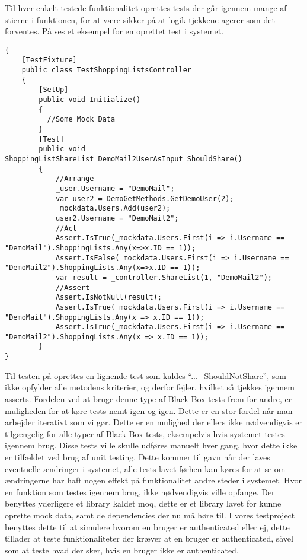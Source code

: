 Til hver enkelt testede funktionalitet oprettes tests der går igennem mange af stierne i funktionen, for at være sikker på at logik tjekkene agerer som det forventes.
På  ses et eksempel for en oprettet test i systemet.

\begin{lstlisting}[caption="En test for ``ShareList'' metodern i ``ShoppingListController''\, heri tjekkes hvorom den bruger listen deles med\, får listen sat ind på brugerens liste over shoppinglister.", label=lsttest]
{
    [TestFixture]
    public class TestShoppingListsController
    {
		[SetUp]
        public void Initialize()
        {
          //Some Mock Data
        }
        [Test]
        public void ShoppingListShareList_DemoMail2UserAsInput_ShouldShare()
        {
            //Arrange
            _user.Username = "DemoMail";
            var user2 = DemoGetMethods.GetDemoUser(2);
            _mockdata.Users.Add(user2); 
            user2.Username = "DemoMail2";
            //Act
            Assert.IsTrue(_mockdata.Users.First(i => i.Username == "DemoMail").ShoppingLists.Any(x=>x.ID == 1));
            Assert.IsFalse(_mockdata.Users.First(i => i.Username == "DemoMail2").ShoppingLists.Any(x=>x.ID == 1));
            var result = _controller.ShareList(1, "DemoMail2");
            //Assert
            Assert.IsNotNull(result);
            Assert.IsTrue(_mockdata.Users.First(i => i.Username == "DemoMail").ShoppingLists.Any(x => x.ID == 1));
            Assert.IsTrue(_mockdata.Users.First(i => i.Username == "DemoMail2").ShoppingLists.Any(x => x.ID == 1));
        }
}        
\end{lstlisting}\label{lsttest}
Til testen på  oprettes en lignende test som kaldes ``...\_ShouldNotShare'', som ikke opfylder alle metodens kriterier, og derfor fejler, hvilket så tjekkes igennem asserts.
Fordelen ved at bruge denne type af Black Box tests frem for andre, er muligheden for at køre tests nemt igen og igen.
Dette er en stor fordel når man arbejder iterativt som vi gør.
Dette er en mulighed der ellers ikke nødvendigvis er tilgængelig for alle typer af Black Box tests, eksempelvis hvis systemet testes igennem brug.
Disse tests ville skulle udføres manuelt hver gang, hvor dette ikke er tilfældet ved brug af unit testing.
Dette kommer til gavn når der laves eventuelle ændringer i systemet, alle tests lavet førhen kan køres for at se om ændringerne har haft nogen effekt på funktionalitet andre steder i systemet. 
Hvor en funktion som testes igennem brug, ikke nødvendigvis ville opfange.
Der benyttes yderligere et library kaldet moq, dette er et library lavet for kunne oprette mock data, samt de dependencies der nu må høre til.
I vores testproject benyttes dette til at simulere hvorom en bruger er authenticated eller ej, dette tillader at teste funktionaliteter der kræver at en bruger er authenticated, såvel som at teste hvad der sker, hvis en bruger ikke er authenticated.


